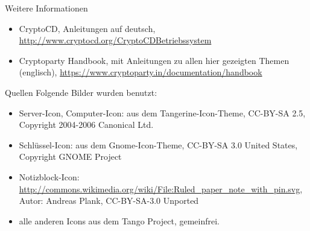 \documentclass{beamer}
\begin{document}
\begin{frame}{Weitere Informationen}
\begin{itemize}
	\item CryptoCD, Anleitungen auf deutsch, 
		\url{http://www.cryptocd.org/CryptoCDBetriebssystem}
	\item Cryptoparty Handbook, mit Anleitungen zu allen hier gezeigten Themen
		(englisch), \url{https://www.cryptoparty.in/documentation/handbook}
\end{itemize}
\end{frame}

\begin{frame}{Quellen}
Folgende Bilder wurden benutzt:
\begin{itemize}
	\item Server-Icon, Computer-Icon: aus dem Tangerine-Icon-Theme, CC-BY-SA 2.5,
		Copyright 2004-2006 Canonical Ltd.
	\item Schlüssel-Icon: aus dem Gnome-Icon-Theme, CC-BY-SA 3.0 United States,
		Copyright GNOME Project
	\item Notizblock-Icon:
		\url{http://commons.wikimedia.org/wiki/File:Ruled_paper_note_with_pin.svg},
		Autor: Andreas Plank, CC-BY-SA-3.0 Unported
	\item alle anderen Icons aus dem Tango Project, gemeinfrei.
\end{itemize}
\end{frame}
\end{document}

